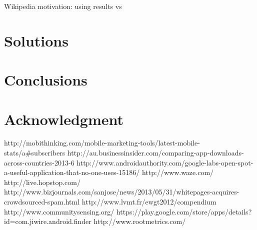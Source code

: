 \documentclass[conference,letterpaper]{IEEEtran}
\begin{document}
Wikipedia motivation: using results vs 
\section{Solutions}
\label{sec:solutions}
\section{Conclusions}
\label{sec:conclusion_and_future_work}
\section{Acknowledgment}
\label{sec:acknowledgment}
http://mobithinking.com/mobile-marketing-tools/latest-mobile-stats/a\#subscribers
http://au.businessinsider.com/comparing-app-downloads-across-countries-2013-6
http://www.androidauthority.com/google-labs-open-spot-a-useful-application-that-no-one-uses-15186/
http://www.waze.com/
http://live.hopstop.com/
http://www.bizjournals.com/sanjose/news/2013/05/31/whitepages-acquires-crowdsourced-spam.html
http://www.lvmt.fr/ewgt2012/compendium
http://www.communitysensing.org/
https://play.google.com/store/apps/details?id=com.jiwire.android.finder
http://www.rootmetrics.com/
\end{document}
